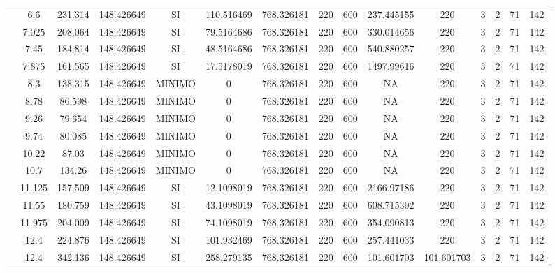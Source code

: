 \begin{table}[H]
{\begin{tabular}{|c|c|c|c|c|c|c|c|c|c|c|c|c|c|c|}
\cline{2-15}    & 6.6 & 231.314 & 148.426649 & SI  & 110.516469 & 768.326181 & 220 & 600 & 237.445155 & 220 & 3   & 2   & 71  & 142 \bigstrut\\
\cline{2-15}    & 7.025 & 208.064 & 148.426649 & SI  & 79.5164686 & 768.326181 & 220 & 600 & 330.014656 & 220 & 3   & 2   & 71  & 142 \bigstrut\\
\cline{2-15}    & 7.45 & 184.814 & 148.426649 & SI  & 48.5164686 & 768.326181 & 220 & 600 & 540.880257 & 220 & 3   & 2   & 71  & 142 \bigstrut\\
\cline{2-15}    & 7.875 & 161.565 & 148.426649 & SI  & 17.5178019 & 768.326181 & 220 & 600 & 1497.99616 & 220 & 3   & 2   & 71  & 142 \bigstrut\\
\cline{2-15}    & 8.3 & 138.315 & 148.426649 & MINIMO & 0   & 768.326181 & 220 & 600 & NA  & 220 & 3   & 2   & 71  & 142 \bigstrut\\
\cline{2-15}    & 8.78 & 86.598 & 148.426649 & MINIMO & 0   & 768.326181 & 220 & 600 & NA  & 220 & 3   & 2   & 71  & 142 \bigstrut\\
\cline{2-15}    & 9.26 & 79.654 & 148.426649 & MINIMO & 0   & 768.326181 & 220 & 600 & NA  & 220 & 3   & 2   & 71  & 142 \bigstrut\\
\cline{2-15}    & 9.74 & 80.085 & 148.426649 & MINIMO & 0   & 768.326181 & 220 & 600 & NA  & 220 & 3   & 2   & 71  & 142 \bigstrut\\
\cline{2-15}    & 10.22 & 87.03 & 148.426649 & MINIMO & 0   & 768.326181 & 220 & 600 & NA  & 220 & 3   & 2   & 71  & 142 \bigstrut\\
\cline{2-15}    & 10.7 & 134.26 & 148.426649 & MINIMO & 0   & 768.326181 & 220 & 600 & NA  & 220 & 3   & 2   & 71  & 142 \bigstrut\\
\cline{2-15}    & 11.125 & 157.509 & 148.426649 & SI  & 12.1098019 & 768.326181 & 220 & 600 & 2166.97186 & 220 & 3   & 2   & 71  & 142 \bigstrut\\
\cline{2-15}    & 11.55 & 180.759 & 148.426649 & SI  & 43.1098019 & 768.326181 & 220 & 600 & 608.715392 & 220 & 3   & 2   & 71  & 142 \bigstrut\\
\cline{2-15}    & 11.975 & 204.009 & 148.426649 & SI  & 74.1098019 & 768.326181 & 220 & 600 & 354.090813 & 220 & 3   & 2   & 71  & 142 \bigstrut\\
\cline{2-15}    & 12.4 & 224.876 & 148.426649 & SI  & 101.932469 & 768.326181 & 220 & 600 & 257.441033 & 220 & 3   & 2   & 71  & 142 \bigstrut\\
\cline{2-15}    & 12.4 & 342.136 & 148.426649 & SI  & 258.279135 & 768.326181 & 220 & 600 & 101.601703 & 101.601703 & 3   & 2   & 71  & 142 \bigstrut\\

\end{tabular}}
\end{table}
